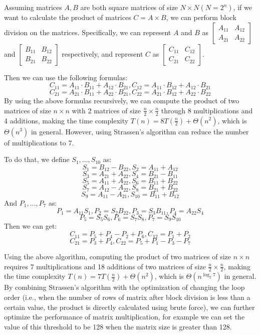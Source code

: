 \documentclass[conference]{IEEEtran}
\begin{document}
	 Assuming matrices $A, B$ are both square matrices of size $N \times N (N = 2 ^ n)$, if we want to calculate the product of matrices $C = A \times B$, we can perform block division on the matrices. Specifically, we can represent $A$ and $B$ as $\begin{bmatrix}
	 	A_{11} & A_{12}\\
	 	A_{21} & A_{22}
	 \end{bmatrix}$ and $\begin{bmatrix}
	 	B_{11} & B_{12}\\
	 	B_{21} & B_{22}
	 \end{bmatrix}$ respectively, and represent $C$ as $\begin{bmatrix}
	 	C_{11} & C_{12}\\
	 	C_{21} & C_{22}
	 \end{bmatrix}$.
 
 Then we can use the following formulas:
	 $$C_{11} = A_{11} \cdot B_{11} + A_{12} \cdot B_{21}, C_{12} = A_{11} \cdot B_{12} + A_{12} \cdot B_{21}$$
	 $$C_{21} = A_{21} \cdot B_{11} + A_{22} \cdot B_{21}, C_{22} = A_{21} \cdot B_{12} + A_{22} \cdot B_{22}$$
	 By using the above formulas recursively, we can compute the product of two matrices of size $n \times n$ with 2 matrices of size $\frac{n}{2} \times \frac{n}{2}$ through 8 multiplications and 4 additions, making the time complexity $T(n) = 8 T(\frac{n}{2}) + \Theta(n^2)$, which is $\Theta(n^3)$ in general. However, using Strassen's algorithm can reduce the number of multiplications to 7.
	 
	 To do that, we define $S_1, ..., S_{10}$ as:
	$$S_1 = B_{12} - B_{22}, S_2 = A_{11} + A_{12}$$ $$S_3 = A_{21} + A_{22}, S_4 = B_{21} - B_{11}$$ $$S_5 = A_{11} + A_{22}, S_6 = B_{11} + B_{22}$$ $$S_7 = A_{12} - A_{22}, S_8 = B_{21} + B_{22}$$ $$S_9 = A_{11} - A_{21}, S_{10} = B_{11} + B_{12}$$
	 And $P_1, ..., P_{7}$ as:
	$$P_1 = A_{11}S_1, P_2 = S_2B_{22}, P_3 = S_3B_{11}, P_4 = A_{22}S_4$$ $$P_5 = S_5S_6, P_6 = S_7S_8, P_7 = S_9S_{10}$$
	 Then we can get:
	$$C_{11} = P_5 + P_4 - P_2 + P_6, C_{12} = P_1 + P_2$$ $$C_{21} = P_3 + P_4, C_{22} = P_5 + P_1 - P_3 - P_7$$
	 
	 Using the above algorithm, computing the product of two matrices of size $n \times n$ requires 7 multiplications and 18 additions of two matrices of size $\frac{n}{2} \times \frac{n}{2}$, making the time complexity $T(n) = 7 T(\frac{n}{2}) + \Theta(n^2)$, which is $\Theta(n^{\log_2 7})$ in general. By combining Strassen's algorithm with the optimization of changing the loop order (i.e., when the number of rows of matrix after block division is less than a certain value, the product is directly calculated using brute force), we can further optimize the performance of matrix multiplication, for example we can set the value of this threshold to be 128 when the matrix size is greater than 128.
	 
\end{document}
